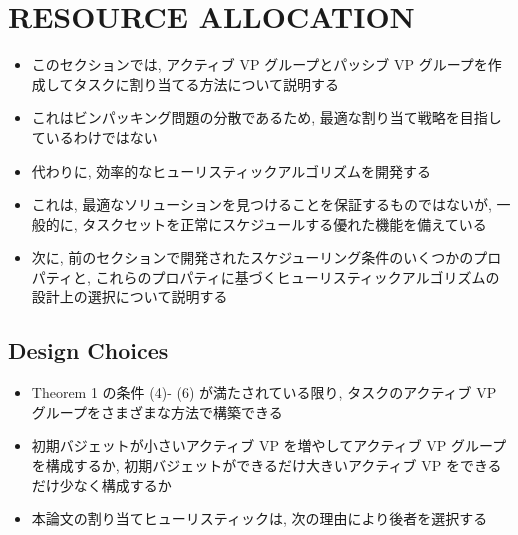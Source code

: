 
\section{RESOURCE ALLOCATION}
\label{sec: resource allocation}

\begin{frame}{}
    \begin{itemize}
        \item このセクションでは, アクティブ VP グループとパッシブ VP グループを作成してタスクに割り当てる方法について説明する
\item これはビンパッキング問題の分散であるため, 最適な割り当て戦略を目指しているわけではない
\item 代わりに, 効率的なヒューリスティックアルゴリズムを開発する
\item これは, 最適なソリューションを見つけることを保証するものではないが, 一般的に, タスクセットを正常にスケジュールする優れた機能を備えている
\item 次に, 前のセクションで開発されたスケジューリング条件のいくつかのプロパティと, これらのプロパティに基づくヒューリスティックアルゴリズムの設計上の選択について説明する
    \end{itemize}
\end{frame}

\subsection{Design Choices}
\label{ssec: design choices}

\begin{frame}{}
    \begin{itemize}
        \item Theorem 1 の条件 (4)- (6) が満たされている限り, タスクのアクティブ VP グループをさまざまな方法で構築できる
\item 初期バジェットが小さいアクティブ VP を増やしてアクティブ VP グループを構成するか, 初期バジェットができるだけ大きいアクティブ VP をできるだけ少なく構成するか
\item 本論文の割り当てヒューリスティックは, 次の理由により後者を選択する
    \end{itemize}
\end{frame}


